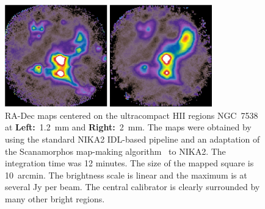 \documentclass{sf2a-conf2016}
\begin{document}








\begin{figure}[ht!]
 \centering
 \includegraphics[width=0.8\textwidth,clip]{desert_fig34}%
 \caption{ RA-Dec maps centered on the ultracompact HII regions NGC~7538 at
   {\bf Left:}~1.2~mm and {\bf Right:}~2~mm. The maps were obtained by using
   the standard NIKA2 IDL-based pipeline and an adaptation of the Scanamorphos
   map-making algorithm~\citep{2013PASP..125.1126R} to NIKA2. The integration
   time was 12 minutes.  The size of the mapped square is 10~arcmin. The
   brightness scale is linear and the maximum is at several Jy per beam. The
   central calibrator is clearly surrounded by many other bright regions.}
  \label{fig3-4}
\end{figure}
\end{document}
